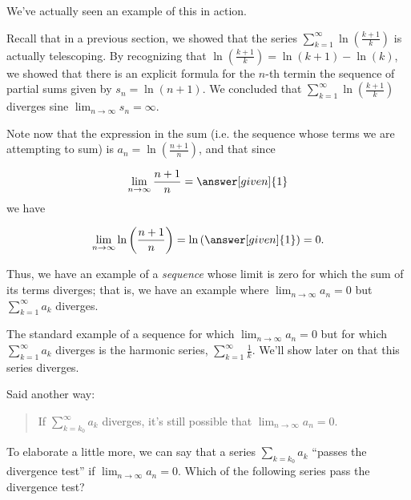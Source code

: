 \documentclass{ximera}
\begin{document}
We've actually seen an example of this in action.  

\begin{example}
Recall that in a previous section, we showed that the series $\sum_{k=1}^\infty \ln\left(\frac{k+1}{k}\right)$ is actually telescoping.  By recognizing that $\ln\left(\frac{k+1}{k}\right) = \ln(k+1)-\ln(k)$, we showed that there is an explicit formula for the $n$-th termin the sequence of partial sums given by $s_n = \ln(n+1)$.  We concluded that $\sum_{k=1}^\infty \ln\left(\frac{k+1}{k}\right)$ diverges sine $\lim_{n \to \infty} s_n = \infty$.   

Note now that the expression in the sum (i.e. the sequence whose terms we are attempting to sum) is $a_n =   \ln\left(\frac{n+1}{n}\right)$, and that since

\[
\lim_{n \to \infty} \frac{n+1}{n} = \answer[given]{1}
\]
we have

\[
\lim_{n \to \infty} \ln\left(\frac{n+1}{n}\right) = \ln\left(\answer[given]{1}\right) = 0.
\]

Thus, we have an example of a \emph{sequence} whose limit is zero for which the sum of its terms diverges; that is, we have an example where $\lim_{n \to \infty} a_n =0$ but $\sum_{k=1}^{\infty} a_k$ diverges.
\end{example}


\begin{remark}
The standard example of a sequence for which $\lim_{n \to \infty} a_n =0$ but for which $\sum_{k=1}^{\infty} a_k$ diverges is the harmonic series, $\sum_{k=1}^{\infty} \frac{1}{k}$.  We'll show later on that this series diverges.
\end{remark}

Said another way: 
\begin{quote}
If $\sum_{k=k_0}^{\infty} a_k$ diverges, it's still possible that  $\lim_{n \to \infty} a_n =0$. 
\end{quote}
  
\begin{question}
To elaborate a little more, we can say that a series $\sum_{k=k_0} a_k$ ``passes the divergence test'' if $\lim_{n \to \infty} a_n=0$.  Which of the following series pass the divergence test?
\begin{selectAll}
\end{selectAll}
\end{question}
\end{document}
